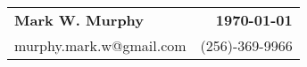\documentclass[10pt]{letter}
\begin{document}
  \begin{tabularx}{\textwidth}{ L R }
    \textbf{\Large Mark W. Murphy} & \textbf{\today} \\
    \small{murphy.mark.w@gmail.com} & \small{(256)-369-9966} \\
  \end{tabularx}

  

  

  


  
\end{document}
